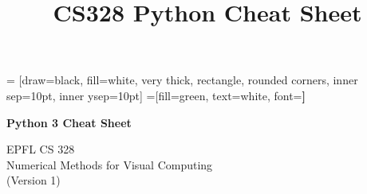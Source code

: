\documentclass{article}
\title{CS328 Python Cheat Sheet}
\begin{document}
 = [draw=black, fill=white, very thick,
    rectangle, rounded corners, inner sep=10pt, inner ysep=10pt]
 =[fill=green, text=white, font=\bfseries]

\begin{multicols*}{3}
%
\begin{center}{\LARGE{\textbf{Python 3 Cheat Sheet}}}\par
{\large EPFL CS 328\\ Numerical Methods for Visual Computing}\\
{\footnotesize (Version 1)}
\end{center}

\vspace*{-0.3cm}



\end{multicols*}
\end{document}
